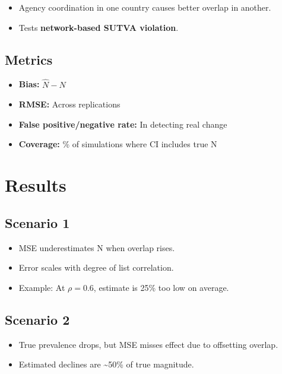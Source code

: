 \documentclass[
  12pt,
]{article}
\providecommand{\tightlist}{%
  \setlength{\itemsep}{0pt}\setlength{\parskip}{0pt}}\usepackage{longtable,booktabs,array}
\theoremstyle{plain}
\theoremstyle{definition}
\begin{document}
\begin{itemize}
\tightlist
\item
  Agency coordination in one country causes better overlap in another.\\
\item
  Tests \textbf{network-based SUTVA violation}.
\end{itemize}

\subsection{Metrics}\label{metrics}

\begin{itemize}
\tightlist
\item
  \textbf{Bias:} \(\hat{N} - N\)\\
\item
  \textbf{RMSE:} Across replications\\
\item
  \textbf{False positive/negative rate:} In detecting real change\\
\item
  \textbf{Coverage:} \% of simulations where CI includes true N
\end{itemize}

\section{Results}\label{results}

\subsection{Scenario 1}\label{scenario-1}

\begin{itemize}
\tightlist
\item
  MSE underestimates N when overlap rises.\\
\item
  Error scales with degree of list correlation.\\
\item
  Example: At \(\rho = 0.6\), estimate is 25\% too low on average.
\end{itemize}

\subsection{Scenario 2}\label{scenario-2}

\begin{itemize}
\tightlist
\item
  True prevalence drops, but MSE misses effect due to offsetting
  overlap.\\
\item
  Estimated declines are \textasciitilde50\% of true magnitude.
\end{itemize}
\end{document}
